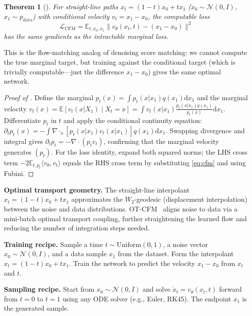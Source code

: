 \documentclass[11pt,letterpaper]{article}
\theoremstyle{plain}
\newtheorem{theorem}{Theorem}[section]
\theoremstyle{definition}
\theoremstyle{remark}
\newcommand{\E}{\mathbb{E}}
\newcommand{\dd}{\mathrm{d}}
\newcommand{\calN}{\mathcal{N}}
\newcommand{\divg}{\nabla\cdot}
\newcommand{\norm}[1]{\lVert #1\rVert}
\begin{document}
\begin{theorem}[\citet{lipman2023flow}]\label{thm:cfm}
For straight-line paths $x_t=(1-t)x_0+tx_1$ ($x_0\sim\calN(0,I)$,
$x_1\sim p_{\mathrm{data}}$) with conditional velocity $v_t=x_1-x_0$,
the computable loss
\begin{equation}
  \mathcal{L}_{\mathrm{CFM}}
  =\E_{t,x_0,x_1}\norm{v_\theta(x_t,t)-(x_1-x_0)}^2
  \label{eq:cfm}
\end{equation}
has the same gradients as the intractable marginal loss.
\end{theorem}

This is the flow-matching analog of denoising score matching: we
cannot compute the true marginal target, but training against the
conditional target (which is trivially computable---just the difference
$x_1-x_0$) gives the same optimal network.

\begin{advancedmath}
\begin{proof}[Proof of ]
Define the marginal $p_t(x)=\int p_t(x|x_1)q(x_1)\dd x_1$ and
the marginal velocity
$v_t(x)=\E[v_t(x|X_1)\mid X_t=x]=\int v_t(x|x_1)\frac{p_t(x|x_1)q(x_1)}{p_t(x)}\dd x_1$.
Differentiate $p_t$ in $t$ and apply the conditional continuity
equation: $\partial_tp_t(x)=-\int\divg_x[p_t(x|x_1)v_t(x|x_1)]q(x_1)\dd x_1$.
Swapping divergence and integral gives $\partial_tp_t=-\divg(p_tv_t)$,
confirming that the marginal velocity generates $(p_t)$.
For the loss identity, expand both squared norms; the LHS cross term
$-2\E_{t,p_t}\langle v_\theta,v_t\rangle$ equals the RHS cross term by
substituting \eqref{eq:cfm} and using Fubini.
\end{proof}

\textbf{Optimal transport geometry.}
The straight-line interpolant $x_t=(1-t)x_0+tx_1$ approximates
the $W_2$-geodesic (displacement interpolation) between the noise
and data distributions.  OT-CFM~\citep{tong2023ot} aligns noise to
data via a mini-batch optimal transport coupling, further straightening
the learned flow and reducing the number of integration steps needed.
\end{advancedmath}

\textbf{Training recipe.}  Sample a time $t\sim\mathrm{Uniform}(0,1)$,
a noise vector $x_0\sim\calN(0,I)$, and a data sample $x_1$ from the
dataset.  Form the interpolant $x_t=(1-t)x_0+tx_1$.  Train the
network to predict the velocity $x_1-x_0$ from $x_t$ and $t$.

\textbf{Sampling recipe.}  Start from $x_0\sim\calN(0,I)$ and solve
$\dot x_t=v_\theta(x_t,t)$ forward from $t=0$ to $t=1$ using any ODE
solver (e.g., Euler, RK45).  The endpoint $x_1$ is the generated
sample.
\end{document}

